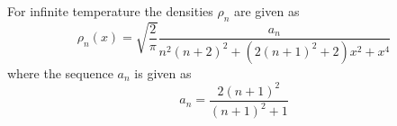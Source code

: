 \documentclass[twocolumn,superscriptaddress,prb,10pt]{revtex4-1}
\begin{document}
For infinite temperature the densities $\rho_n$ are given as 
%
\begin{equation}
\rho_n(x)=\sqrt{\frac{2}{\pi}}\frac{a_n}{n^2(n+2)^2+(2(n+1)^2+2)x^2+x^4}
\end{equation}
%
where the sequence $a_n$ is given as 
%
\begin{equation}
a_n=\frac{2(n+1)^2}{(n+1)^2+1}
\end{equation}
%


\begin{thebibliography}{99}


\end{thebibliography}
\end{document}
